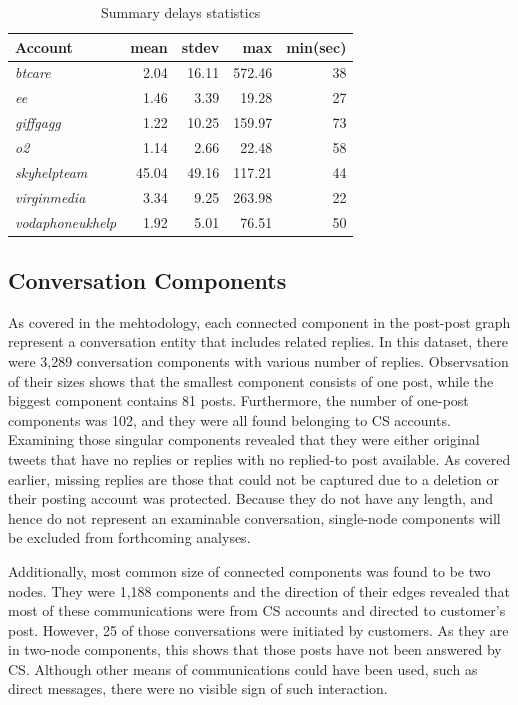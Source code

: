 \documentclass[sigconf]{acmart}
\begin{document}
\begin{table}[!h]
\centering
\begin{tabularx}{\columnwidth}{lrrrr}
\toprule
\textbf{Account} & \textbf{mean} & \textbf{stdev} & \textbf{max} & \textbf{min(sec)} \\ 
\midrule
{\emph{btcare}} & 2.04 & 16.11 & 572.46 & 38\\
{\emph{ee}} & 1.46 & 3.39 & 19.28 & 27\\
{\emph{giffgagg}} & 1.22 & 10.25 & 159.97 & 73\\ 
{\emph{o2}} & 1.14 & 2.66 & 22.48 & 58\\
{\emph{skyhelpteam}} & 45.04 & 49.16 & 117.21 & 44\\
{\emph{virginmedia}} & 3.34 & 9.25 & 263.98 & 22\\
{\emph{vodaphoneukhelp}} & 1.92 & 5.01 & 76.51 & 50\\
\bottomrule
\end{tabularx}
\caption{Summary delays statistics}
\label{tbl:delaystats}
\end{table}

\subsection{Conversation Components}

As covered in the mehtodology, each connected component in the post-post 
graph represent a conversation entity that includes related replies. 
In this dataset, there were 3,289 conversation components with various number
of replies. Observsation of their sizes shows that the smallest component
consists of one post, while the biggest component contains 81 posts. 
Furthermore, the number of one-post components was 102, and they were all 
found belonging to CS accounts. Examining those singular components revealed that 
they were either original tweets that have no replies or replies with no
replied-to post available. As covered earlier, missing replies are those that 
could not be captured due to a deletion or their posting account was protected. 
Because they do not have any length, and hence do not represent an examinable
conversation, single-node components will be excluded from forthcoming
analyses.

Additionally, most common size of connected components was found to be two nodes. 
They were 1,188 components and the direction of their edges revealed
that most of these communications were from CS accounts and directed
to customer's post. However, 25 of those conversations were initiated by customers. 
As they are in two-node components, this shows that those posts have not been 
answered by CS. Although other means of communications could have been used, such as 
direct messages, there were no visible sign of such interaction.
\end{document}
